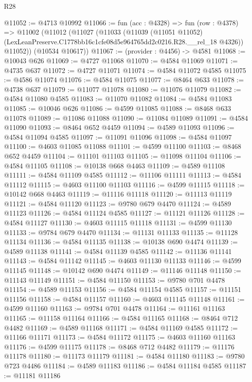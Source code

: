 \begin{lexlean}{R28}
\begin{coremodule}
@11052 := @4713 @10992
@11066 := fun (acc : @4328) =>
  fun (row : @4378) =>
  @11002
    (@11012
      (@11027
        (@11033
          (@11039
            (@11051 @11052)
            (LexLeanPreserve.C1778bb16c1cfe08d5e964765dd2c0216.R28.__rel_18 @4326))
          @11052))
      (@10534 @10617))
@11067 := (provider : @4456) -> @4581
@11068 := @10043 @626
@11069 := @4727 @11068
@11070 := @4584 @11069
@11071 := @4735 @637
@11072 := @4727 @11071
@11074 := @4584 @11072 @4585
@11075 := @4586 @11074
@11076 := @4584 @11075
@11077 := @8464 @633
@11078 := @4738 @637
@11079 := @11077 @11078
@11080 := @11076 @11079
@11082 := @4584 @11080 @4585
@11083 := @11070 @11082
@11084 := @4584 @11083
@11085 := @10046 @626
@11086 := @4599 @11085
@11088 := @8468 @633 @11078
@11089 := @11086 @11088
@11090 := @11084 @11089
@11091 := @4584 @11090
@11093 := @8464 @652 @4459
@11094 := @4589 @11093
@11096 := @4584 @11094 @4585
@11097 := @11091 @11096
@11098 := @4584 @11097
@11100 := @4603 @11085 @11088
@11101 := @4599 @11100
@11103 := @8468 @652 @4459
@11104 := @11101 @11103
@11105 := @11098 @11104
@11106 := @4584 @11105
@11108 := @10138 @668 @4463
@11109 := @4589 @11108
@11111 := @4584 @11109 @4585
@11112 := @11106 @11111
@11113 := @4584 @11112
@11115 := @4603 @11100 @11103
@11116 := @4599 @11115
@11118 := @10142 @668 @4463
@11119 := @11116 @11118
@11120 := @11113 @11119
@11121 := @4584 @11120
@11123 := @9780 @679 @4470
@11124 := @4589 @11123
@11126 := @4584 @11124 @4585
@11127 := @11121 @11126
@11128 := @4584 @11127
@11130 := @4603 @11115 @11118
@11131 := @4599 @11130
@11133 := @9784 @679 @4470
@11134 := @11131 @11133
@11135 := @11128 @11134
@11136 := @4584 @11135
@11138 := @10138 @690 @4474
@11139 := @4589 @11138
@11141 := @4584 @11139 @4585
@11142 := @11136 @11141
@11143 := @4584 @11142
@11145 := @4603 @11130 @11133
@11146 := @4599 @11145
@11148 := @10142 @690 @4474
@11149 := @11146 @11148
@11150 := @11143 @11149
@11151 := @4584 @11150
@11153 := @9780 @701 @4478
@11154 := @4589 @11153
@11156 := @4584 @11154 @4585
@11157 := @11151 @11156
@11158 := @4584 @11157
@11160 := @4603 @11145 @11148
@11161 := @4599 @11160
@11163 := @9784 @701 @4478
@11164 := @11161 @11163
@11165 := @11158 @11164
@11166 := @4584 @11165
@11168 := @8464 @712 @4482
@11169 := @4589 @11168
@11171 := @4584 @11169 @4585
@11172 := @11166 @11171
@11173 := @4584 @11172
@11175 := @4603 @11160 @11163
@11176 := @4599 @11175
@11178 := @8468 @712 @4482
@11179 := @11176 @11178
@11180 := @11173 @11179
@11181 := @4584 @11180
@11183 := @9780 @723 @4486
@11184 := @4589 @11183
@11186 := @4584 @11184 @4585
@11187 := @11181 @11186

\end{coremodule}
\end{lexlean}
